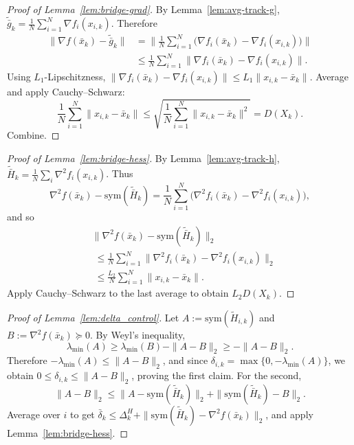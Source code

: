 \documentclass[11pt,a4paper]{article}
\begin{document}
\begin{proof}[Proof of Lemma~\ref{lem:bridge-grad}]
By Lemma~\ref{lem:avg-track-g}, $\tilde{\bar g}_k=\frac1N\sum_{i=1}^N\nabla f_i(x_{i,k})$.
Therefore
\begin{align*}
\|\nabla f(\bar x_k)\!-\!\tilde{\bar g}_k\|
&=\Big\|\tfrac1N\textstyle\sum_{i=1}^N\!\big(\nabla f_i(\bar x_k)\!-\!\nabla f_i(x_{i,k})\big)\Big\|\\
&\le \tfrac1N\textstyle\sum_{i=1}^N \|\nabla f_i(\bar x_k)\!-\!\nabla f_i(x_{i,k})\|.
\end{align*}
Using $L_1$-Lipschitzness, $\|\nabla f_i(\bar x_k)-\nabla f_i(x_{i,k})\|\le L_1\|x_{i,k}-\bar x_k\|$.
Average and apply Cauchy--Schwarz:
\[
\frac1N\sum_{i=1}^N\|x_{i,k}-\bar x_k\|
\le \sqrt{\frac1N\sum_{i=1}^N\|x_{i,k}-\bar x_k\|^2}=D(X_k).
\]
Combine.
\end{proof}

\begin{proof}[Proof of Lemma~\ref{lem:bridge-hess}]
By Lemma~\ref{lem:avg-track-h}, $\tilde{\bar H}_k=\frac1N\sum_i \nabla^2 f_i(x_{i,k})$.
Thus
\[
\nabla^2 f(\bar x_k)-\mathrm{sym}(\tilde{\bar H}_k)
=\frac1N\sum_{i=1}^N\big(\nabla^2 f_i(\bar x_k)-\nabla^2 f_i(x_{i,k})\big),
\]
and so
\begin{align*}
&\|\nabla^2 f(\bar x_k)\!-\!\mathrm{sym}(\tilde{\bar H}_k)\|_2\\
&\;\le \tfrac1N\textstyle\sum_{i=1}^N\|\nabla^2 f_i(\bar x_k)\!-\!\nabla^2 f_i(x_{i,k})\|_2\\
&\;\le \tfrac{L_2}{N}\textstyle\sum_{i=1}^N\|x_{i,k}\!-\!\bar x_k\|.
\end{align*}
Apply Cauchy--Schwarz to the last average to obtain $L_2 D(X_k)$.
\end{proof}

\begin{proof}[Proof of Lemma~\ref{lem:delta_control}]
Let $A:=\mathrm{sym}(\tilde H_{i,k})$ and $B:=\nabla^2 f(\bar x_k)\succeq0$.
By Weyl's inequality,
\[
\lambda_{\min}(A)\ge \lambda_{\min}(B)-\|A-B\|_2\ge -\|A-B\|_2.
\]
Therefore $-\lambda_{\min}(A)\le \|A-B\|_2$, and since $\delta_{i,k}=\max\{0,-\lambda_{\min}(A)\}$,
we obtain $0\le \delta_{i,k}\le \|A-B\|_2$, proving the first claim.
For the second,
\[
\|A-B\|_2\le \|A-\mathrm{sym}(\tilde{\bar H}_k)\|_2+\|\mathrm{sym}(\tilde{\bar H}_k)-B\|_2.
\]
Average over $i$ to get $\bar\delta_k\le \Delta_k^H+\|\mathrm{sym}(\tilde{\bar H}_k)-\nabla^2 f(\bar x_k)\|_2$,
and apply Lemma~\ref{lem:bridge-hess}.
\end{proof}
\end{document}
